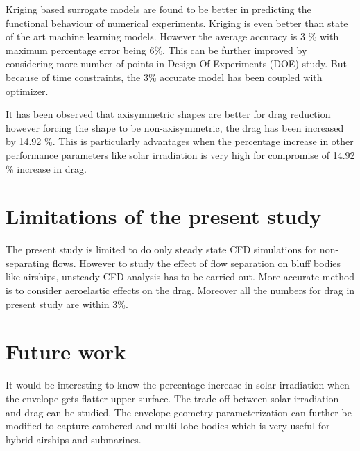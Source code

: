 Kriging based surrogate models are found to be better in predicting the functional behaviour of numerical experiments. Kriging is even better than state of the art machine learning models. However the average accuracy is 3 \% with maximum percentage error being 6\%. This can be further improved by considering more number of points in Design Of Experiments (DOE) study. But because of time constraints, the 3\% accurate model has been coupled with optimizer. 

It has been observed that axisymmetric shapes are better for drag reduction however forcing the shape to be non-axisymmetric, the drag has been increased by 14.92 \%. This is particularly advantages when the percentage increase in other performance parameters like solar irradiation is very high for compromise of 14.92 \% increase in drag.

\section{Limitations of the present study}
The present study is limited to do only steady state CFD simulations for non-separating flows. However to study the effect of flow separation on bluff bodies like airships, unsteady CFD analysis has to be carried out. More accurate method is to consider aeroelastic effects on the drag. Moreover all the numbers for drag in present study are within 3\%.

\section{Future work}
It would be interesting to know the percentage increase in solar irradiation when the envelope gets flatter upper surface. The trade off between solar irradiation and drag can be studied. The envelope geometry parameterization can further be modified to capture cambered and multi lobe bodies which is very useful for hybrid airships and submarines. 
